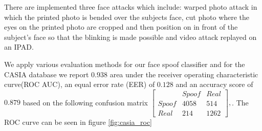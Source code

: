 There are implemented three face attacks which include: warped photo attack in which the printed photo is bended over the subjects face, cut photo where the eyes on the printed photo are cropped and then position on in front of the subject's face so that the blinking is made possible and video attack replayed on an IPAD.

We apply various evaluation methods for our face spoof classifier and for the CASIA database we report $0.938$ area under the receiver operating characteristic curve(ROC AUC), an equal error rate (EER) of $0.128$ and an accuracy score of $0.879$ based on the following confusion matrix
$
[
\begin{smallmatrix}
&Spoof & Real\\
Spoof & 4058 & 514\\
Real & 214 & 1262
\end{smallmatrix}], 
$. The ROC curve can be seen in figure \ref{fig:casia_roc}
